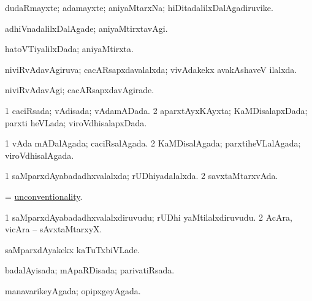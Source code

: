 \bentry
{} 
\gl{\nA}
\expl{}
\bmng
 dudaRmayxte; adamayxte; aniyaMtarxNa; hiDitadalilxDalAgadiruvike. 
\emng
\eentry

\bentry
{} 
\gl{\kirxvi}
\expl{}
\bmng
 adhiVnadalilxDalAgade; aniyaMtirxtavAgi. 
\emng
\eentry

\bentry
{} 
\gl{\gu}
\expl{}
\bmng
hatoVTiyalilxDada; aniyaMtirxta. 
\emng
\eentry

\bentry
{} 
\gl{\gu}
\expl{}
\bmng
 niviRvAdavAgiruva; cacARsapxdavalalxda; vivAdakekx avakAshaveV ilalxda. 
\emng
\eentry

\bentry
{} 
\gl{\kirxvi}
\expl{}
\bmng
 niviRvAdavAgi; cacARsapxdavAgirade. 
\emng
\eentry

\bentry
{} 
\gl{\gu}
\expl{}
\bmng
\bnum
\num{1} caciRsada; vAdisada; vAdamADada. 
\num{2} aparxtAyxKAyxta; KaMDisalapxDada; parxti heVLada; viroVdhisalapxDada. 
\enum
\emng
\eentry

\bentry
{} 
\gl{\gu}
\expl{}
\bmng
\bnum
\num{1} vAda mADalAgada; caciRsalAgada. 
\num{2} KaMDisalAgada; parxtiheVLalAgada; viroVdhisalAgada. 
\enum
\emng
\eentry

\bentry
{} 
\gl{\gu}
\expl{}
\bmng
\bnum
\num{1} saMparxdAyabadadhxvalalxda; rUDhiyadalalxda. 
\num{2} savxtaMtarxvAda. 
\enum
\emng
\eentry

\bentry
{}
\gl{\nA}
\expl{}
\bmng
= \hyperlink{unconventionality}{unconventionality}. 
\emng
\eentry

\bentry
{} 
\gl{\nA}
\expl{}
\bmng
\bnum
\num{1} saMparxdAyabadadhxvalalxdiruvudu; rUDhi yaMtilalxdiruvudu. 
\num{2} AcAra, vicAra -- sAvxtaMtarxyX. 
\enum
\emng
\eentry

\bentry
{} 
\gl{\kirxvi}
\expl{}
\bmng
 saMparxdAyakekx kaTuTxbiVLade. 
\emng
\eentry

\bentry
{} 
\gl{\gu}
\expl{}
\bmng
 badalAyisada; mApaRDisada; parivatiRsada. 
\emng
\eentry

\bentry
{} 
\gl{\gu}
\expl{}
\bmng
 manavarikeyAgada; opipxgeyAgada. 
\emng
\eentry

